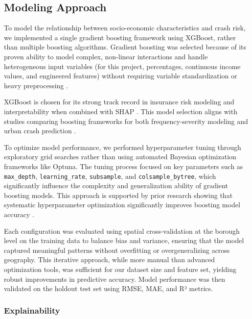 \documentclass[
  number,
  review,
  3p]{elsarticle}
\begin{document}
\subsection{\texorpdfstring{\textbf{Modeling
Approach}}{Modeling Approach}}\label{modeling-approach}

To model the relationship between socio-economic characteristics and
crash risk, we implemented a single gradient boosting framework using
XGBoost, rather than multiple boosting algorithms. Gradient boosting was
selected because of its proven ability to model complex, non-linear
interactions and handle heterogeneous input variables (for this project,
percentages, continuous income values, and engineered features) without
requiring variable standardization or heavy preprocessing
\citep{clemente, mohamed}.

XGBoost is chosen for its strong track record in insurance risk modeling
and interpretability when combined with SHAP \citep{dong}. This model
selection aligns with studies comparing boosting frameworks for both
frequency-severity modeling \citep{henckaerts} and urban crash
prediction \citep{adeniyi}.

To optimize model performance, we performed hyperparameter tuning
through exploratory grid searches rather than using automated Bayesian
optimization frameworks like Optuna. The tuning process focused on key
parameters such as \texttt{max\_depth}, \texttt{learning\_rate},
\texttt{subsample}, and \texttt{colsample\_bytree}, which significantly
influence the complexity and generalization ability of gradient boosting
models. This approach is supported by prior research showing that
systematic hyperparameter optimization significantly improves boosting
model accuracy \citep{liu}.

Each configuration was evaluated using spatial cross-validation at the
borough level on the training data to balance bias and variance,
ensuring that the model captured meaningful patterns without overfitting
or overgeneralizing across geography. This iterative approach, while
more manual than advanced optimization tools, was sufficient for our
dataset size and feature set, yielding robust improvements in predictive
accuracy. Model performance was then validated on the holdout test set
using RMSE, MAE, and R² metrics.

\subsubsection{Explainability}\label{explainability}
\end{document}
